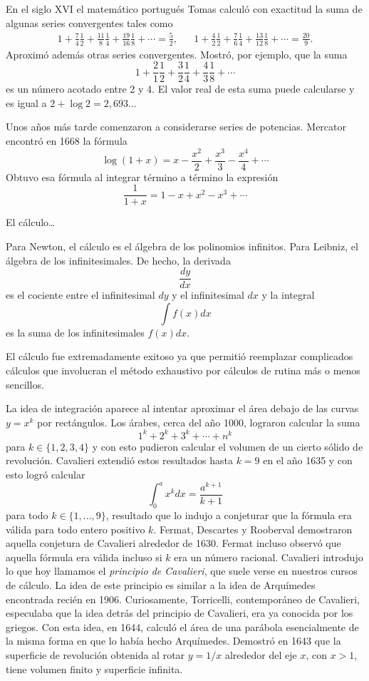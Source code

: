 En el siglo XVI el matemático portugués Tomas calculó con exactitud la suma de
algunas series convergentes tales como 
\begin{align*}
	1+\frac74\frac12+\frac{11}{8}\frac14+\frac{19}{16}\frac18+\cdots = \frac52, && 
	1+\frac42\frac12+\frac76\frac14+\frac{13}{12}\frac18+\cdots=\frac{20}{9}.
\end{align*}
Aproximó además otras series convergentes. Mostró, por ejemplo, que la suma
\[
	1+\frac21\frac12+\frac32\frac14+\frac43\frac18+\cdots
\]
es un número acotado entre 2 y 4. El valor real de esta suma puede calcularse y
es igual a $2+\log 2=2,693\dots$ 

Unos años más tarde comenzaron a considerarse series de potencias. Mercator
encontró en 1668 la fórmula
\[
	\log(1+x)=x-\frac{x^2}{2}+\frac{x^3}{3}-\frac{x^4}{4}+\cdots
\]
Obtuvo esa fórmula al integrar término a término 
la expresión
\[
	\frac{1}{1+x}=1-x+x^2-x^3+\cdots
\]


El cálculo\dots

Para Newton, el cálculo es el álgebra de los polinomios infinitos. Para Leibniz, el álgebra de los infinitesimales. De hecho,
la derivada 
\[
	\dfrac{dy}{dx}
\]
es el cociente entre el infinitesimal $dy$ y el infinitesimal $dx$ y la integral 
\[
	\int f(x)dx
\]
es la suma de los infinitesimales $f(x)dx$. 

El cálculo fue extremadamente exitoso ya que permitió reemplazar complicados
cálculos que involucran el método exhaustivo por cálculos de rutina más o menos
sencillos. 

La idea de integración aparece al intentar aproximar el área debajo de las curvas $y=x^k$ 
por rectángulos. Los árabes, cerca del año 1000, lograron calcular la suma
\[
	1^k+2^k+3^k+\cdots+n^k
\]
para $k\in\{1,2,3,4\}$ y con esto pudieron calcular el volumen de un cierto sólido de revolución. 
Cavalieri extendió estos resultados hasta $k=9$ en el año 1635 y con esto logró calcular
\[
	\int_0^a x^kdx=\frac{a^{k+1}}{k+1}
\]
para todo $k\in\{1,\dots,9\}$, resultado que lo indujo a conjeturar que la
fórmula era válida para todo entero positivo $k$. Fermat, Descartes y Rooberval
demostraron aquella conjetura de Cavalieri alrededor de 1630. Fermat incluso
observó que aquella fórmula era válida incluso si $k$ era un número racional.
Cavalieri introdujo lo que hoy llamamos el \emph{principio de Cavalieri}, que
suele verse en nuestros cursos de cálculo. La idea de este principio es similar
a la idea de Arquímedes encontrada recién en 1906. Curiosamente, Torricelli,
contemporáneo de Cavalieri, especulaba que la idea detrás del principio de
Cavalieri, era ya conocida por los griegos. Con esta idea, en 1644, calculó el
área de una parábola esencialmente de la misma forma en que lo había hecho
Arquímedes. Demostró en 1643 que la superficie de revolución obtenida al rotar
$y=1/x$ alrededor del eje $x$, con $x>1$, tiene volumen finito y superficie
infinita.

